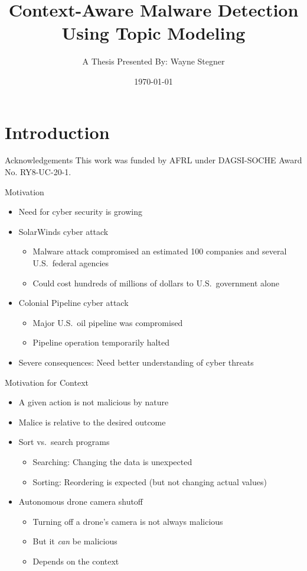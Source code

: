 \documentclass[handout,11pt]{beamer}
\title{Context-Aware Malware Detection Using Topic Modeling}
\author[W. Stegner]{A Thesis Presented By: Wayne Stegner}
\date{\today}
\institute[]{%
	\normalsize
	Committee Members: \\
	Dr.\ Rashmi Jha (Chair) \\
	Dr.\ Carla Purdy \\
	Dr.\ David Kapp \\
	Dr.\ Temesguen Kebede
}
\begin{document}
	\section{Introduction}
	\begin{frame}
		\centering
		\titlepage{}
	\end{frame}
	\begin{frame}{Acknowledgements}
		This work was funded by AFRL under DAGSI-SOCHE Award No. RY8-UC-20-1.
	\end{frame}
	\begin{frame}{Motivation}
		\begin{itemize}
			\item Need for cyber security is growing
			\item SolarWinds cyber attack
				\begin{itemize}
					\item Malware attack compromised an estimated 100 companies and
						several U.S.\ federal agencies
					\item Could cost hundreds of millions of dollars to U.S.\ government
						alone
				\end{itemize}
			\item Colonial Pipeline cyber attack
				\begin{itemize}
					\item Major U.S.\ oil pipeline was compromised
					\item Pipeline operation temporarily halted
				\end{itemize}
			\item Severe consequences: Need better understanding of cyber threats
		\end{itemize}
	\end{frame}
	\begin{frame}{Motivation for Context}
		\begin{itemize}
			\item A given action is not malicious by nature
			\item Malice is relative to the desired outcome
			\item Sort vs.\ search programs
				\begin{itemize}
					\item Searching: Changing the data is unexpected
					\item Sorting: Reordering is expected (but not changing actual
						values)
				\end{itemize}
			\item Autonomous drone camera shutoff
				\begin{itemize}
					\item Turning off a drone's camera is not always malicious
					\item But it \textit{can} be malicious
					\item Depends on the context
				\end{itemize}
		\end{itemize}
	\end{frame}
\end{document}
